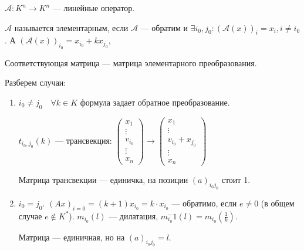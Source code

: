 \begin{definition}
    $\mathcal{A}\!: K^n \to K^n$ --- линейные оператор.

    $\mathcal{A}$ называется элементарным, если  $\mathcal{A}$ --- обратим и $\exists i_0, j_0\!: (\mathcal{A}(x))_i = x_i, i \neq i_0$. А $(\mathcal{A}(x))_{i_0} = x_{i_0} + kx_{j_0}$,

    Соответствующая матрица --- матрица элементарного преобразования.
\end{definition}

Разберем случаи:
\begin{enumerate}
    \item $i_0 \neq j_0 \quad \forall k \in K$ формула задает обратное преобразование. 

        $t_{i_0, j_0}(k)$ --- трансвекция: $\begin{pmatrix} x_1 \\ \vdots \\ v_{i_0} \\ \vdots  \\ x_n \end{pmatrix} \to \begin{pmatrix} x_1 \\ \vdots \\ v_{i_0} + x_{j_0} \\ \vdots  \\ x_n \end{pmatrix}$

        Матрица трансвекции --- единичка, на позиции $(a)_{i_0j_0}$ стоит 1.
    \item $i_0 = j_0$. $(Ax)_{i=0} = (k+1)x_{i_0} = k \cdot x_{i_0}$ --- обратимо, если $e \neq 0$ (в общем случае $e \not \in K^*$). $m_{i_0}(l)$ --- дилатация, $m_{i_0}^-1(l) = m_{i_0}(\frac{1}{k})$. 

        Матрица --- единичная, но на $(a)_{i_0 j_0} = l$.
\end{enumerate}


